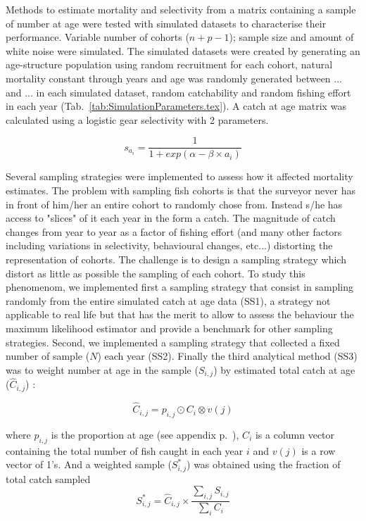 Methods to estimate mortality and selectivity from a matrix containing a sample of number at age were tested with simulated datasets to characterise their performance. Variable number of cohorts ($n+p-1$); sample size and amount of white noise were simulated. The simulated datasets were created by generating an age-structure population using random recruitment for each cohort, natural mortality constant through years and age was randomly generated between ... and ... in each simulated dataset, random catchability and random fishing effort in each year (Tab.~\ref{tab:SimulationParameters.tex}). A catch at age matrix was calculated using a logistic gear selectivity with 2 parameters. 

\begin{equation}
s_{a_{i}} = \frac{1}{1  + exp( \alpha - \beta \times a_{i})}
\end{equation}

Several sampling strategies were implemented to assess how it affected mortality estimates. The problem with sampling fish cohorts is that the surveyor never has in front of him/her an entire cohort to randomly chose from. Instead s/he has access to "slices" of it each year in the form a catch. The magnitude of catch changes from year to year as a factor of fishing effort (and many other factors including variations in selectivity, behavioural changes, etc...) distorting the representation of cohorts. The challenge is to design a sampling strategy which distort as little as possible the sampling of each cohort. To study this phenomenom, we implemented first a sampling strategy that consist in sampling randomly from the entire simulated catch at age data (SS1), a strategy not applicable to real life but that has the merit to allow to assess the behaviour the maximum likelihood estimator and provide a benchmark for other sampling strategies. Second, we implemented a sampling strategy that collected a fixed number of sample ($N$) each year (SS2). Finally the third analytical method (SS3) was to weight number at age in the sample ($S_{i,j}$) by estimated total catch at age ($\hat{C}_{i,j}$) :

\begin{equation}
\hat{C}_{i,j} = p_{i,j} \odot C_{i} \otimes v(j)
\end{equation}

\noindent where $p_{i,j}$ is the proportion at age (see appendix p.~\pageref{Appendix:DefinitionsOfMathematicalSymbols}), $C_{i}$ is a column vector containing the total number of fish caught in each year $i$ and $v(j)$ is a row vector of 1's. 
And a weighted sample ($S^{*}_{i,j}$) was obtained using the fraction of total catch sampled
\begin{equation}
S^{*}_{i,j} = \hat{C}_{i,j} \times \frac{\sum_{i,j} S_{i,j}}{\sum_{i} C_{i}}
\end{equation}

